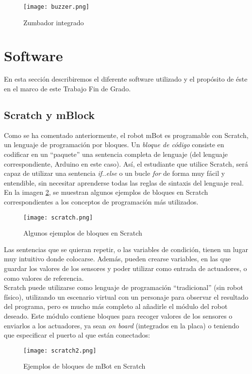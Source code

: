 \begin{figure}[H]
	\texttt{[image: buzzer.png]}
	\centering
	\caption{Zumbador integrado}
	\label{img:zumbador}
\end{figure}

\section{Software}\label{sec:software}
En esta sección describiremos el diferente software utilizado y el propósito de éste en el marco de este Trabajo Fin de Grado. 

\subsection{Scratch y mBlock}\label{subsec:scratch}
Como se ha comentado anteriormente, el robot mBot es programable con Scratch, un lenguaje de programación por bloques. Un \textit{bloque de código} consiste en codificar en un ``paquete'' una sentencia completa de lenguaje (del lenguaje correspondiente, Arduino en este caso). Así, el estudiante que utilice Scratch, será capaz de utilizar una sentencia \textit{if..else} o un bucle \textit{for} de forma muy fácil y entendible, sin necesitar aprenderse todas las reglas de sintaxis del lenguaje real. En la imagen \ref{img:scratch}, se muestran algunos ejemplos de bloques en Scratch correspondientes a los conceptos de programación más utilizados.
\begin{figure}[H]
	\texttt{[image: scratch.png]}
	\centering
	\caption{Algunos ejemplos de bloques en Scratch}
	\label{img:scratch}
\end{figure}
Las sentencias que se quieran repetir, o las variables de condición, tienen un lugar muy intuitivo donde colocarse. Además, pueden crearse variables, en las que guardar los valores de los sensores y poder utilizar como entrada de actuadores, o como valores de referencia. \\
Scratch puede utilizarse como lenguaje de programación ``tradicional'' (sin robot físico), utilizando un escenario virtual con un personaje para observar el resultado del programa, pero es mucho más completo al añadirle el módulo del robot deseado. Este módulo contiene bloques para recoger valores de los sensores o enviarlos a los actuadores, ya sean \textit{on board} (integrados en la placa) o teniendo que especificar el puerto al que están conectados:
\begin{figure}[H]
	\texttt{[image: scratch2.png]}
	\centering
	\label{img:scratch2}
	\caption{Ejemplos de bloques de mBot en Scratch}
\end{figure}

